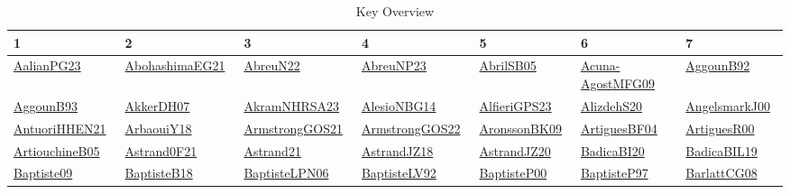 {\scriptsize
\begin{longtable}{*{7}{l}}
\caption{Key Overview}\\ \toprule
1 & 2 & 3 & 4 & 5 & 6 & 7\\ \midrule
\endhead
\bottomrule
\endfoot
\href{papers/AalianPG23.pdf}{AalianPG23}~\cite{AalianPG23} & \href{articles/AbohashimaEG21.pdf}{AbohashimaEG21}~\cite{AbohashimaEG21} & \href{articles/AbreuN22.pdf}{AbreuN22}~\cite{AbreuN22} & \href{}{AbreuNP23}~\cite{AbreuNP23} & \href{papers/AbrilSB05.pdf}{AbrilSB05}~\cite{AbrilSB05} & \href{papers/Acuna-AgostMFG09.pdf}{Acuna-AgostMFG09}~\cite{Acuna-AgostMFG09} & \href{}{AggounB92}~\cite{AggounB92}\\ 
\href{articles/AggounB93.pdf}{AggounB93}~\cite{AggounB93} & \href{papers/AkkerDH07.pdf}{AkkerDH07}~\cite{AkkerDH07} & \href{articles/AkramNHRSA23.pdf}{AkramNHRSA23}~\cite{AkramNHRSA23} & \href{papers/AlesioNBG14.pdf}{AlesioNBG14}~\cite{AlesioNBG14} & \href{articles/AlfieriGPS23.pdf}{AlfieriGPS23}~\cite{AlfieriGPS23} & \href{}{AlizdehS20}~\cite{AlizdehS20} & \href{papers/AngelsmarkJ00.pdf}{AngelsmarkJ00}~\cite{AngelsmarkJ00}\\ 
\href{papers/AntuoriHHEN21.pdf}{AntuoriHHEN21}~\cite{AntuoriHHEN21} & \href{papers/ArbaouiY18.pdf}{ArbaouiY18}~\cite{ArbaouiY18} & \href{papers/ArmstrongGOS21.pdf}{ArmstrongGOS21}~\cite{ArmstrongGOS21} & \href{papers/ArmstrongGOS22.pdf}{ArmstrongGOS22}~\cite{ArmstrongGOS22} & \href{papers/AronssonBK09.pdf}{AronssonBK09}~\cite{AronssonBK09} & \href{papers/ArtiguesBF04.pdf}{ArtiguesBF04}~\cite{ArtiguesBF04} & \href{articles/ArtiguesR00.pdf}{ArtiguesR00}~\cite{ArtiguesR00}\\ 
\href{papers/ArtiouchineB05.pdf}{ArtiouchineB05}~\cite{ArtiouchineB05} & \href{papers/Astrand0F21.pdf}{Astrand0F21}~\cite{Astrand0F21} & \href{}{Astrand21}~\cite{Astrand21} & \href{papers/AstrandJZ18.pdf}{AstrandJZ18}~\cite{AstrandJZ18} & \href{articles/AstrandJZ20.pdf}{AstrandJZ20}~\cite{AstrandJZ20} & \href{}{BadicaBI20}~\cite{BadicaBI20} & \href{papers/BadicaBIL19.pdf}{BadicaBIL19}~\cite{BadicaBIL19}\\ 
\href{papers/Baptiste09.pdf}{Baptiste09}~\cite{Baptiste09} & \href{articles/BaptisteB18.pdf}{BaptisteB18}~\cite{BaptisteB18} & \href{}{BaptisteLPN06}~\cite{BaptisteLPN06} & \href{papers/BaptisteLV92.pdf}{BaptisteLV92}~\cite{BaptisteLV92} & \href{articles/BaptisteP00.pdf}{BaptisteP00}~\cite{BaptisteP00} & \href{papers/BaptisteP97.pdf}{BaptisteP97}~\cite{BaptisteP97} & \href{papers/BarlattCG08.pdf}{BarlattCG08}~\cite{BarlattCG08}\\ 

\end{longtable}}
